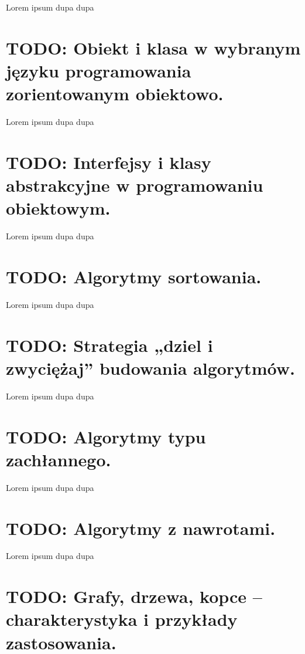 \documentclass[a4paper,12pt,oneside]{book}
\begin{document}
		    Lorem ipsum dupa dupa
		
		\setcounter{section}{13}
		\section{\color{red} TODO: Obiekt i klasa w wybranym języku programowania zorientowanym obiektowo. }
		    
		    Lorem ipsum dupa dupa
		
		\setcounter{section}{15}
		\section{\color{red} TODO: Interfejsy i klasy abstrakcyjne w programowaniu obiektowym. }
		    
		    Lorem ipsum dupa dupa
		
		\setcounter{section}{17}
		\section{\color{red} TODO: Algorytmy sortowania. }
		    
		    Lorem ipsum dupa dupa
		
		
		\setcounter{section}{18}
		\section{\color{red} TODO: Strategia „dziel i zwyciężaj” budowania algorytmów. }
		    
		    Lorem ipsum dupa dupa
		
		\setcounter{section}{19}
		\section{\color{red} TODO: Algorytmy typu zachłannego. }
		    
		    Lorem ipsum dupa dupa
		
		\setcounter{section}{20}
		\section{\color{red} TODO: Algorytmy z nawrotami. }
		    
		    Lorem ipsum dupa dupa
		
		\setcounter{section}{21}
		\section{\color{red} TODO: Grafy, drzewa, kopce – charakterystyka i przykłady zastosowania. }
		    
\end{document}

